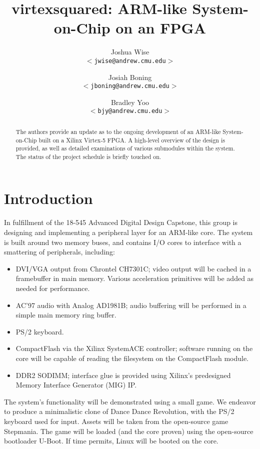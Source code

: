 \documentclass[10pt,twocolumn]{article}
\title{virtexsquared: ARM-like System-on-Chip on an FPGA}
\author{Joshua Wise\\
\texttt{$<$jwise@andrew.cmu.edu$>$} \and
Josiah Boning\\
\texttt{$<$jboning@andrew.cmu.edu$>$} \and
Bradley Yoo\\
\texttt{$<$bjy@andrew.cmu.edu$>$}}
\begin{document}
\maketitle

\begin{abstract}

The authors provide an update as to the ongoing development of an ARM-like
System-on-Chip built on a Xilinx Virtex-5 FPGA.  A high-level overview of
the design is provided, as well as detailed examinations of various
submodules within the system.  The status of the project schedule is briefly
touched on.

\end{abstract}

\vspace{0.1in} %

\section{Introduction}

In fulfillment of the 18-545 Advanced Digital Design Capstone, this group
is designing and implementing a peripheral layer for an ARM-like core. 
The system is built around two memory buses, and contains I/O cores to
interface with a smattering of peripherals, including:

\begin{itemize}
\item{DVI/VGA output from Chrontel CH7301C; video output will be cached in a
framebuffer in main memory.  Various acceleration primitives will be added
as needed for performance.}
\item{AC'97 audio with Analog AD1981B; audio buffering will be performed in
a simple main memory ring buffer.}
\item{PS/2 keyboard.}
\item{CompactFlash via the Xilinx SystemACE controller; software running on
the core will be capable of reading the filesystem on the CompactFlash
module.}
\item{DDR2 SODIMM; interface glue is provided using Xilinx's predesigned
Memory Interface Generator (MIG) IP.}
\end{itemize}

The system's functionality will be demonstrated using a small game. We
endeavor to produce a minimalistic clone of Dance Dance Revolution, with the
PS/2 keyboard used for input.  Assets will be taken from the open-source
game Stepmania.  The game will be loaded (and the core proven) using the
open-source bootloader U-Boot.  If time permits, Linux will be booted on the
core.
\end{document}
